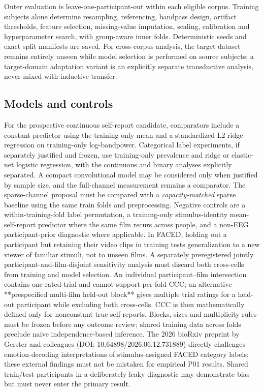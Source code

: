 Outer evaluation is leave-one-participant-out within each eligible corpus. Training subjects alone determine resampling, referencing, bandpass design, artifact thresholds, feature selection, missing-value imputation, scaling, calibration and hyperparameter search, with group-aware inner folds. Deterministic seeds and exact split manifests are saved. For cross-corpus analysis, the target dataset remains entirely unseen while model selection is performed on source subjects; a target-domain adaptation variant is an explicitly separate transductive analysis, never mixed with inductive transfer.

\subsection{Models and controls}
For the prospective continuous self-report candidate, comparators include a constant predictor using the training-only mean and a standardized L2 ridge regression on training-only log-bandpower. Categorical label experiments, if separately justified and frozen, use training-only prevalence and ridge or elastic-net logistic regression, with the continuous and binary analyses explicitly separated. A compact convolutional model may be considered only when justified by sample size, and the full-channel measurement remains a comparator. The sparse-channel proposal must be compared with a \emph{capacity-matched} sparse baseline using the same train folds and preprocessing. Negative controls are a within-training-fold label permutation, a training-only stimulus-identity mean-self-report predictor where the same film recurs across people, and a non-EEG participant-prior diagnostic where applicable. In FACED, holding out a participant but retaining their video clips in training tests generalization to a new viewer of familiar stimuli, not to unseen films. A separately preregistered jointly participant-and-film-disjoint sensitivity analysis must discard both cross-cells from training and model selection. An individual participant–film intersection contains one rated trial and cannot support per-fold CCC; an alternative **prespecified multi-film held-out block** gives multiple trial ratings for a held-out participant while excluding both cross-cells. CCC is then mathematically defined only for nonconstant true self-reports. Blocks, sizes and multiplicity rules must be frozen before any outcome review; shared training data across folds preclude naive independence-based inference. The 2026 bioRxiv preprint by Gerster and colleagues (DOI: 10.64898/2026.06.12.731889) directly challenges emotion-decoding interpretations of stimulus-assigned FACED category labels; these external findings must not be mistaken for empirical P01 results. Shared train/test participants in a deliberately leaky diagnostic may demonstrate bias but must never enter the primary result.

